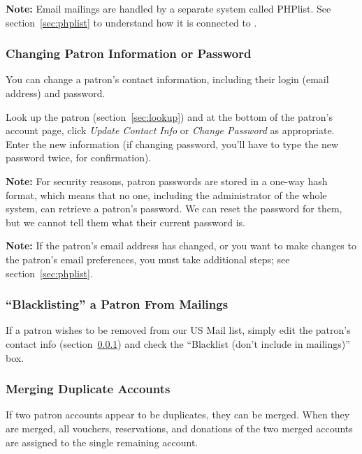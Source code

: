 \textbf{Note:} Email mailings are handled by a separate system called
PHPlist.  See section~\ref{sec:phplist} to understand how it is
connected to \af.

\subsubsection{Changing Patron Information or Password}
\label{sec:changeinfo}
\label{sec:changepassword}

You can  change a patron's contact information, including their login
(email address) and password.

Look up the patron (section~\ref{sec:lookup}) and at the bottom of the
patron's account page,  click \emph{Update Contact Info} or \emph{Change
  Password} as appropriate.  Enter the new information (if changing
password, you'll have to type the new password twice, for confirmation).

\textbf{Note:} For security reasons, patron passwords are stored in a
one-way hash format, which means that no one, including the
administrator of the whole system, can retrieve a patron's password.  We
can reset the password for them, but we cannot tell them what their
current password is.

\textbf{Note:} If the patron's email address has changed, or you want to
make changes to the patron's email preferences, you must take additional
steps; see section~\ref{sec:phplist}.


\subsubsection{``Blacklisting'' a Patron From Mailings}
\label{sec:blacklisting}

If a patron wishes to be removed from our US Mail list, simply edit the
patron's contact info (section~\ref{sec:changeinfo}) and check the
``Blacklist (don't include in mailings)'' box.

\subsubsection{Merging Duplicate Accounts}
\label{sec:merging}

If two patron accounts appear to be duplicates, they can be merged.
When they are merged, all vouchers, reservations, and donations of the
two merged accounts are assigned to the single remaining account.

